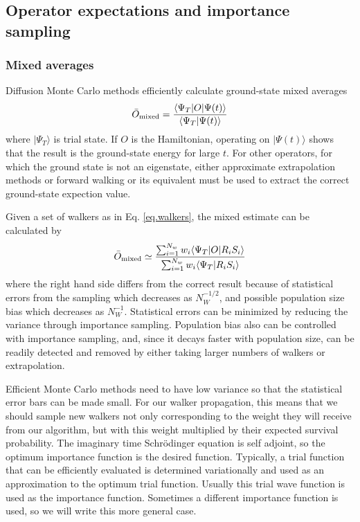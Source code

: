  \subsection{Operator expectations and importance sampling}
 \subsubsection{Mixed averages}
 \label{sec:mixav}
 Diffusion Monte Carlo methods efficiently calculate ground-state
 mixed averages
 \begin{equation}
 \label{eq:mixedobs}
 \bar O_{\rm mixed} = \frac{\langle \Psi_T | O |\Psi(t)\rangle}{\langle
 	\Psi_T|\Psi(t)\rangle}
 \end{equation}
 where $|\Psi_T\rangle $ is  trial state.
 If $O$ is the Hamiltonian, operating on $|\Psi(t)\rangle$ shows
 that the result
 is the ground-state energy for large $t$. For other operators, for which
 the ground state is not an eigenstate, either
 approximate extrapolation methods or forward walking or its equivalent
 must be used to extract the correct ground-state expection value.
 
 Given a set of walkers as in Eq. \ref{eq.walkers}, the mixed estimate can
 be calculated by
 \begin{equation}
 \bar O_{\rm mixed} \simeq
 \frac{ \sum_{i=1}^{N_w} w_i \langle \Psi_T|O|R_i S_i\rangle}
 { \sum_{i=1}^{N_w} w_i \langle \Psi_T|R_i S_i\rangle}
 \end{equation}
 where the right hand side differs from the correct result because
 of statistical errors from the sampling which decreases as $N_W^{-1/2}$,
 and possible population size bias which decreases as $N_W^{-1}$. Statistical
 errors can be minimized by reducing the variance through importance
 sampling.  Population
 bias also can be controlled with importance sampling, and, since it decays
 faster with population size, can be readily detected
 and removed by either taking larger numbers of walkers or extrapolation.
 
 Efficient Monte Carlo methods need to have low variance so that the
 statistical error bars can be made small. For our walker propagation,
 this means that we should sample new walkers not only corresponding to
 the weight they will receive from our algorithm, but with this weight
 multiplied by their expected survival probability. The imaginary time
 Schr\"odinger equation is self adjoint, so the optimum importance
 function is the desired function\cite{xxx2010}. Typically, a trial
 function that can be efficiently evaluated is determined variationally
 and used as an approximation to the optimum trial function. Usually
 this trial wave function is used as the importance
 function. Sometimes a different importance function is used, so we will
 write this more general case. 
 
